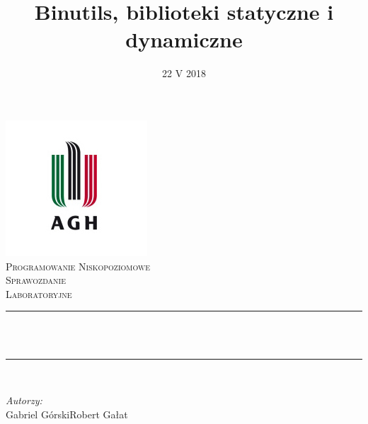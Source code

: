 \documentclass[12pt]{article}
\title{Binutils, biblioteki statyczne i dynamiczne} %
\author{} %
\date{22 V 2018}
\begin{document}

\begin{titlepage}
  \centering \vspace*{0.5 cm} \includegraphics[scale = 0.75]{agh.jpg}\\[1.0
  cm] %
  \textsc{\Large Programowanie Niskopoziomowe}\\[0.5 cm] %
  \textsc{\large Sprawozdanie\\Laboratoryjne}\\[0.5 cm] %
  \rule{\linewidth}{0.2 mm} \\[0.4 cm]
  { \huge \bfseries \thetitle}\\
  \rule{\linewidth}{0.2 mm} \\[1.5 cm]

  \begin{minipage}{0.4\textwidth}
    \begin{flushleft} \large \vspace{3cm}
      \emph{Autorzy:}\\
      Gabriel Górski\newline Robert Gałat %
    \end{flushleft}
  \end{minipage}~
  \begin{minipage}{0.4\textwidth}
    \begin{flushright} \large
    \end{flushright}
  \end{minipage}\\[1 cm]
  {\large \thedate}
  \pagebreak

\end{titlepage}

\end{document}
